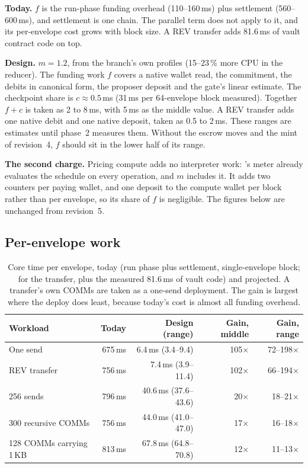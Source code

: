 \documentclass[11pt]{article}
\newcommand{\code}{\path}
\begin{document}
\textbf{Today.} $f$ is the run-phase funding overhead (110--160\,ms) plus settlement (560--600\,ms), and settlement is one chain. The parallel term does not apply to it, and its per-envelope cost grows with block size. A REV transfer adds 81.6\,ms of vault contract code on top.

\textbf{Design.} $m = 1.2$, from the branch's own profiles (15--23\,\% more CPU in the reducer). The funding work $f$ covers a native wallet read, the commitment, the debits in canonical form, the proposer deposit and the gate's linear estimate. The checkpoint share is $c \approx 0.5$\,ms (31\,ms per 64-envelope block measured). Together $f + c$ is taken as 2 to 8\,ms, with 5\,ms as the middle value. A REV transfer adds one native debit and one native deposit, taken as 0.5 to 2\,ms. These ranges are estimates until phase~2 measures them. Without the escrow moves and the mint of revision~4, $f$ should sit in the lower half of its range.

\textbf{The second charge.} Pricing compute adds no interpreter work: \code{dev}'s meter already evaluates the schedule on every operation, and $m$ includes it. It adds two counters per paying wallet, and one deposit to the compute wallet per block rather than per envelope, so its share of $f$ is negligible. The figures below are unchanged from revision~5.

\subsection{Per-envelope work}

\begin{table}[h]
\centering\small
\begin{tabular}{@{}lrrrr@{}}
\toprule
\textbf{Workload} & \textbf{Today} & \textbf{Design (range)} & \textbf{Gain, middle} & \textbf{Gain, range} \\
\midrule
One send & 675\,ms & 6.4\,ms (3.4--9.4) & 105$\times$ & 72--198$\times$ \\
REV transfer & 756\,ms & 7.4\,ms (3.9--11.4) & 102$\times$ & 66--194$\times$ \\
256 sends & 796\,ms & 40.6\,ms (37.6--43.6) & 20$\times$ & 18--21$\times$ \\
300 recursive COMMs & 756\,ms & 44.0\,ms (41.0--47.0) & 17$\times$ & 16--18$\times$ \\
128 COMMs carrying 1\,KB & 813\,ms & 67.8\,ms (64.8--70.8) & 12$\times$ & 11--13$\times$ \\
\bottomrule
\end{tabular}
\caption{Core time per envelope, today (run phase plus settlement, single-envelope block; for the transfer, plus the measured 81.6\,ms of vault code) and projected. A transfer's own COMMs are taken as a one-send deployment. The gain is largest where the deploy does least, because today's cost is almost all funding overhead.}
\label{tab:gain}
\end{table}
\end{document}
